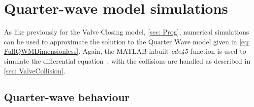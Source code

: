 \chapter{Quarter-wave model simulations} \label{sec: QWSim}

As like previously for the Valve Closing model, \cref{sec: Prog}, numerical simulations can be used to approximate the solution to the Quarter Wave model given in \cref{eq: FullQWMDimensionless}. Again, the MATLAB inbuilt \textit{ode45} function is used to simulate the differential equation~\cite{Shampine1997TheSuite}, with the collisions are handled as described in \cref{sec: ValveCollision}.

\section{Quarter-wave behaviour} \label{subsec: QWBehavSim}

